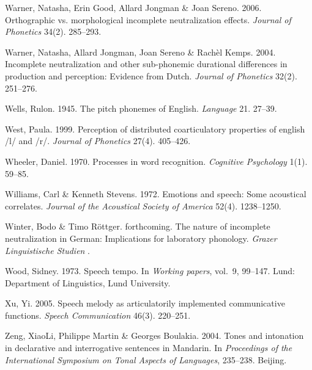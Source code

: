 \documentclass[ number=1
,series=labphon
,output=long
,url=http://langsci-press.org/catalog/book/16
,isbn=978-3-944675-01-5
]{LSP/langsci}
\begin{document}
\begin{thebibliography}{284}
\newpage
{}
Warner, Natasha, Erin Good, Allard Jongman \& Joan Sereno. 2006.
\newblock Orthographic vs. morphological incomplete neutralization effects.
\newblock \emph{Journal of Phonetics} 34(2). 285--293.

Warner, Natasha, Allard Jongman, Joan Sereno \& Rachèl Kemps. 2004.
\newblock Incomplete neutralization and other sub-phonemic durational
  differences in production and perception: {E}vidence from {D}utch.
\newblock \emph{Journal of Phonetics} 32(2). 251--276.

Wells, Rulon. 1945.
\newblock The pitch phonemes of {E}nglish.
\newblock \emph{Language} 21. 27--39.

West, Paula. 1999.
\newblock Perception of distributed coarticulatory properties of english /l/
  and /r/.
\newblock \emph{Journal of Phonetics} 27(4). 405--426.

Wheeler, Daniel. 1970.
\newblock Processes in word recognition.
\newblock \emph{Cognitive Psychology} 1(1). 59--85.

Williams, Carl \& Kenneth Stevens. 1972.
\newblock Emotions and speech: {S}ome acoustical correlates.
\newblock \emph{Journal of the Acoustical Society of America} 52(4).
  1238--1250.

Winter, Bodo \& Timo R{\"o}ttger. forthcoming.
\newblock The nature of incomplete neutralization in {G}erman: {I}mplications
  for laboratory phonology.
\newblock \emph{Grazer Linguistische Studien} .

Wood, Sidney. 1973.
\newblock Speech tempo.
\newblock In \emph{Working papers}, vol.~9, 99--147. Lund: Department of
  Linguistics, Lund University.

Xu, Yi. 2005.
\newblock Speech melody as articulatorily implemented communicative functions.
\newblock \emph{Speech Communication} 46(3). 220--251.

Zeng, XiaoLi, Philippe Martin \& Georges Boulakia. 2004.
\newblock Tones and intonation in declarative and interrogative sentences in
  {M}andarin.
\newblock In \emph{Proceedings of the {International Symposium on Tonal Aspects
  of Languages}}, 235--238. Beijing.

\end{thebibliography}
\end{document}
